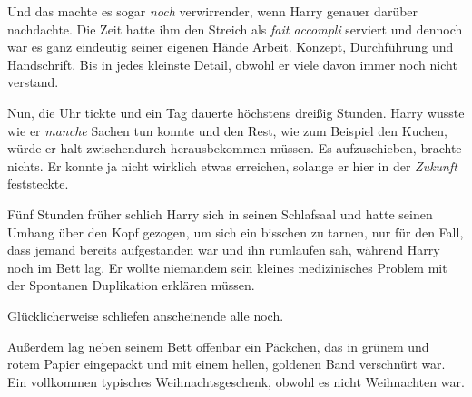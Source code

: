Und das machte es sogar \emph{noch} verwirrender, wenn Harry genauer darüber nachdachte. Die Zeit hatte ihm den Streich als \emph{fait accompli} serviert und dennoch war es ganz eindeutig seiner eigenen Hände Arbeit. Konzept, Durchführung und Handschrift. Bis in jedes kleinste Detail, obwohl er viele davon immer noch nicht verstand.

Nun, die Uhr tickte und ein Tag dauerte höchstens dreißig Stunden. Harry wusste wie er \emph{manche} Sachen tun konnte und den Rest, wie zum Beispiel den Kuchen, würde er halt zwischendurch herausbekommen müssen. Es aufzuschieben, brachte nichts. Er konnte ja nicht wirklich etwas erreichen, solange er hier in der \emph{Zukunft} feststeckte.

\later

Fünf Stunden früher schlich Harry sich in seinen Schlafsaal und hatte seinen Umhang über den Kopf gezogen, um sich ein bisschen zu tarnen, nur für den Fall, dass jemand bereits aufgestanden war und ihn rumlaufen sah, während Harry noch im Bett lag. Er wollte niemandem sein kleines medizinisches Problem mit der Spontanen Duplikation erklären müssen.

Glücklicherweise schliefen anscheinende alle noch.

Außerdem lag neben seinem Bett offenbar ein Päckchen, das in grünem und rotem Papier eingepackt und mit einem hellen, goldenen Band verschnürt war. Ein vollkommen typisches Weihnachtsgeschenk, obwohl es nicht Weihnachten war.

